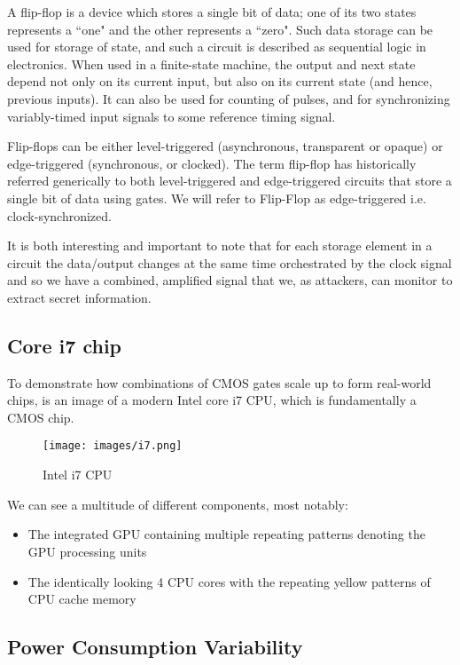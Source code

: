 A flip-flop is a device which stores a single bit of data; one of
its two states represents a ``one" and the other represents a ``zero". Such data
storage can be used for storage of state, and such a circuit is described as
sequential logic in electronics. When used in a finite-state machine, the output
and next state depend not only on its current input, but also on its current
state (and hence, previous inputs). It can also be used for counting of pulses,
and for synchronizing variably-timed input signals to some reference timing
signal.

Flip-flops can be either level-triggered (asynchronous, transparent or opaque)
or edge-triggered (synchronous, or clocked). The term flip-flop has historically
referred generically to both level-triggered and edge-triggered circuits that
store a single bit of data using gates. We will refer to Flip-Flop as
edge-triggered i.e. clock-synchronized.

It is both interesting and important to note that for each storage element in a circuit
the data/output changes at the same time orchestrated by the clock signal and so we have a combined, amplified signal that we, as attackers, can monitor to extract secret information.

 \subsection {Core i7 chip}
 To demonstrate how combinations of CMOS gates scale up to form real-world chips,  is an image of a modern Intel core i7 CPU, which is fundamentally a CMOS chip.

\begin{figure}[!ht]
	\centering
	\texttt{[image: images/i7.png]}
	\caption{Intel i7 CPU} \label{fig:i7}
\end{figure}

We can see a multitude of different components, most notably:
\begin{itemize}
    \item The integrated GPU containing multiple repeating patterns denoting the GPU processing units
    \item The identically looking 4 CPU cores with the repeating yellow patterns of CPU cache memory
\end{itemize}

\subsection {Power Consumption Variability}

